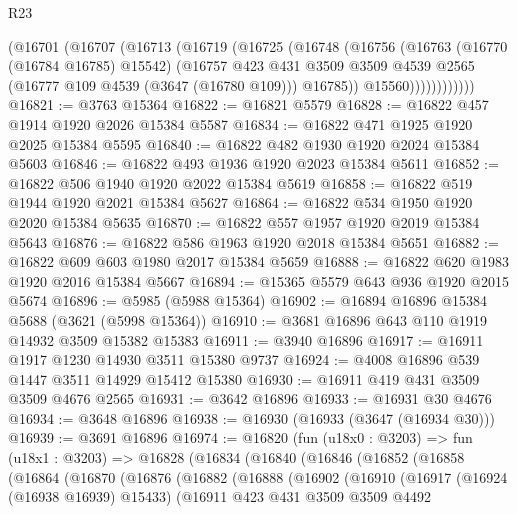 \begin{lexlean}{R23}
\begin{coremodule}
              (@16701
                (@16707
                  (@16713
                    (@16719
                      (@16725
                        (@16748
                          (@16756
                            (@16763
                              (@16770 (@16784 @16785) @15542)
                              (@16757
                                @423
                                @431
                                @3509
                                @3509
                                @4539
                                @2565
                                (@16777 @109 @4539 (@3647 (@16780 @109)))
                                @16785))
                            @15560))))))))))))
@16821 := @3763 @15364
@16822 := @16821 @5579
@16828 := @16822 @457 @1914 @1920 @2026 @15384 @5587
@16834 := @16822 @471 @1925 @1920 @2025 @15384 @5595
@16840 := @16822 @482 @1930 @1920 @2024 @15384 @5603
@16846 := @16822 @493 @1936 @1920 @2023 @15384 @5611
@16852 := @16822 @506 @1940 @1920 @2022 @15384 @5619
@16858 := @16822 @519 @1944 @1920 @2021 @15384 @5627
@16864 := @16822 @534 @1950 @1920 @2020 @15384 @5635
@16870 := @16822 @557 @1957 @1920 @2019 @15384 @5643
@16876 := @16822 @586 @1963 @1920 @2018 @15384 @5651
@16882 := @16822 @609 @603 @1980 @2017 @15384 @5659
@16888 := @16822 @620 @1983 @1920 @2016 @15384 @5667
@16894 := @15365 @5579 @643 @936 @1920 @2015 @5674
@16896 := @5985 (@5988 @15364)
@16902 := @16894 @16896 @15384 @5688 (@3621 (@5998 @15364))
@16910 := @3681 @16896 @643 @110 @1919 @14932 @3509 @15382 @15383
@16911 := @3940 @16896
@16917 := @16911 @1917 @1230 @14930 @3511 @15380 @9737
@16924 := @4008 @16896 @539 @1447 @3511 @14929 @15412 @15380
@16930 := @16911 @419 @431 @3509 @3509 @4676 @2565
@16931 := @3642 @16896
@16933 := @16931 @30 @4676
@16934 := @3648 @16896
@16938 := @16930 (@16933 (@3647 (@16934 @30)))
@16939 := @3691 @16896
@16974 := @16820
    (fun (u18x0 : @3203) =>
    fun (u18x1 : @3203) =>
    @16828
      (@16834
        (@16840
          (@16846
            (@16852
              (@16858
                (@16864
                  (@16870
                    (@16876
                      (@16882
                        (@16888
                          (@16902
                            (@16910
                              (@16917
                                (@16924 (@16938 @16939) @15433)
                                (@16911
                                  @423
                                  @431
                                  @3509
                                  @3509
                                  @4492

\end{coremodule}
\end{lexlean}
